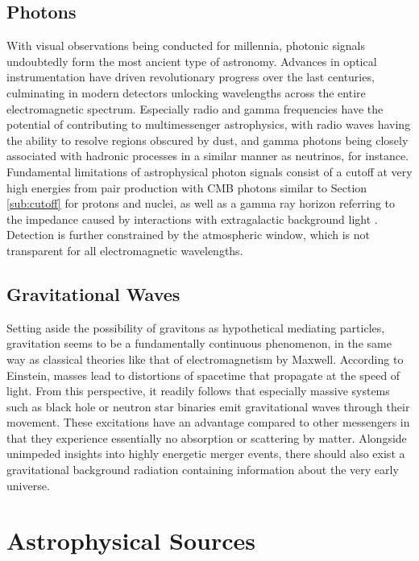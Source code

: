 \subsection{Photons}
\label{sub:photons}

With visual observations being conducted for millennia, photonic signals undoubtedly form the most ancient type of astronomy.
Advances in optical instrumentation have driven revolutionary progress over the last centuries, culminating in modern detectors
unlocking wavelengths across the entire electromagnetic spectrum. Especially radio and gamma frequencies have the potential of
contributing to multimessenger astrophysics, with radio waves having the ability to resolve regions obscured by dust, and gamma
photons being closely associated with hadronic processes in a similar manner as neutrinos, for instance. Fundamental limitations
of astrophysical photon signals consist of a cutoff at very high energies from pair production with CMB photons similar to
Section \ref{sub:cutoff} for protons and nuclei, as well as a gamma ray horizon referring to the impedance caused by
interactions with extragalactic background light \cite{Dominguez_2013}. Detection is further constrained by the atmospheric
window, which is not transparent for all electromagnetic wavelengths.



\subsection{Gravitational Waves}
\label{sub:gravitational}

Setting aside the possibility of gravitons as hypothetical mediating particles, gravitation seems to be a fundamentally continuous
phenomenon, in the same way as classical theories like that of electromagnetism by Maxwell. According to Einstein, masses lead to
distortions of spacetime that propagate at the speed of light. From this perspective, it readily follows that especially massive
systems such as black hole or neutron star binaries emit gravitational waves through their movement. These excitations have an
advantage compared to other messengers in that they experience essentially no absorption or scattering by matter. Alongside unimpeded
insights into highly energetic merger events, there should also exist a gravitational background radiation containing information about
the very early universe.


\newpage


\section{Astrophysical Sources}
\label{sec:sources}

